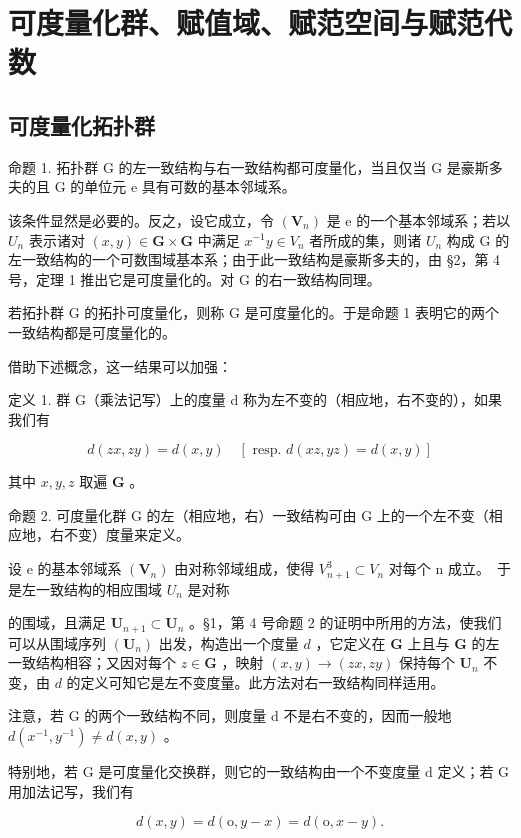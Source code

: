 \section{可度量化群、赋值域、赋范空间与赋范代数}

\subsection{可度量化拓扑群}

命题 1. 拓扑群 G 的左一致结构与右一致结构都可度量化，当且仅当 G 是豪斯多夫的且 G 的单位元 e 具有可数的基本邻域系。

该条件显然是必要的。反之，设它成立，令 \((\mathbf{V}_{n})\) 是 e 的一个基本邻域系；若以 \(U_{n}\) 表示诸对 \((x, y) \in \mathbf{G} \times \mathbf{G}\) 中满足 \(x^{-1}y \in V_{n}\) 者所成的集，则诸 \(U_{n}\) 构成 G 的左一致结构的一个可数围域基本系；由于此一致结构是豪斯多夫的，由 §2，第 4 号，定理 1 推出它是可度量化的。对 G 的右一致结构同理。

若拓扑群 G 的拓扑可度量化，则称 G 是可度量化的。于是命题 1 表明它的两个一致结构都是可度量化的。

借助下述概念，这一结果可以加强：

定义 1. 群 G（乘法记写）上的度量 d 称为左不变的（相应地，右不变的），如果我们有

\[
d (z x, z y) = d (x, y) \quad [ \text { resp. } d (x z, y z) = d (x, y) ]
\]

其中 \(x, y, z\) 取遍 \(\mathbf{G}\) 。

命题 2. 可度量化群 G 的左（相应地，右）一致结构可由 G 上的一个左不变（相应地，右不变）度量来定义。

设 e 的基本邻域系 \((\mathbf{V}_{n})\) 由对称邻域组成，使得 \(V_{n+1}^{3} \subset V_{n}\) 对每个 n 成立。~于是左一致结构的相应围域 \(U_{n}\) 是对称

的围域，且满足 \(\mathbf{U}_{n+1} \subset \mathbf{U}_n\) 。§1，第 4 号命题 2 的证明中所用的方法，使我们可以从围域序列 \((\mathbf{U}_n)\) 出发，构造出一个度量 \(d\) ，它定义在 \(\mathbf{G}\) 上且与 \(\mathbf{G}\) 的左一致结构相容；又因对每个 \(z \in \mathbf{G}\) ，映射 \((x, y) \to (zx, zy)\) 保持每个 \(\mathbf{U}_n\) 不变，由 \(d\) 的定义可知它是左不变度量。此方法对右一致结构同样适用。

注意，若 G 的两个一致结构不同，则度量 d 不是右不变的，因而一般地 \(d(x^{-1}, y^{-1}) \neq d(x, y)\) 。

特别地，若 G 是可度量化交换群，则它的一致结构由一个不变度量 d 定义；若 G 用加法记写，我们有

\[
d (x, y) = d (\mathrm{o}, y - x) = d (\mathrm{o}, x - y).
\]

